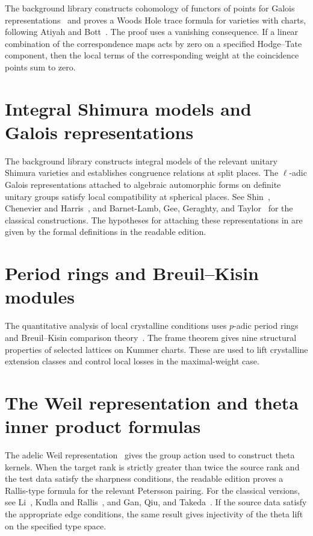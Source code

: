 The background library constructs cohomology of functors of points for Galois representations~\cite{Milne1980} and proves a Woods Hole trace formula for varieties with charts, following Atiyah and Bott~\cite{AtiyahBott1968}. The proof uses a vanishing consequence. If a linear combination of the correspondence maps acts by zero on a specified Hodge--Tate component, then the local terms of the corresponding weight at the coincidence points sum to zero.

\section{Integral Shimura models and Galois representations}

The background library constructs integral models of the relevant unitary Shimura varieties and establishes congruence relations at split places. The $\ell$-adic Galois representations attached to algebraic automorphic forms on definite unitary groups satisfy local compatibility at spherical places. See Shin~\cite{Shin2011}, Chenevier and Harris~\cite{ChenevierHarris2013}, and Barnet-Lamb, Gee, Geraghty, and Taylor~\cite{BLGGT2014} for the classical constructions. The hypotheses for attaching these representations in  are given by the formal definitions in the readable edition.

\section{Period rings and Breuil--Kisin modules}

The quantitative analysis of local crystalline conditions uses $p$-adic period rings and Breuil--Kisin comparison theory~\cite{Kisin2006,BhattScholze2023}. The frame theorem gives nine structural properties of selected lattices on Kummer charts. These are used to lift crystalline extension classes and control local losses in the maximal-weight case.

\section{The Weil representation and theta inner product formulas}

The adelic Weil representation~\cite{Weil1964,Howe1989} gives the group action used to construct theta kernels. When the target rank is strictly greater than twice the source rank and the test data satisfy the sharpness conditions, the readable edition proves a Rallis-type formula for the relevant Petersson pairing. For the classical versions, see Li~\cite{Li1992}, Kudla and Rallis~\cite{KudlaRallis1994}, and Gan, Qiu, and Takeda~\cite{GQT2014}. If the source data satisfy the appropriate edge conditions, the same result gives injectivity of the theta lift on the specified type space.

